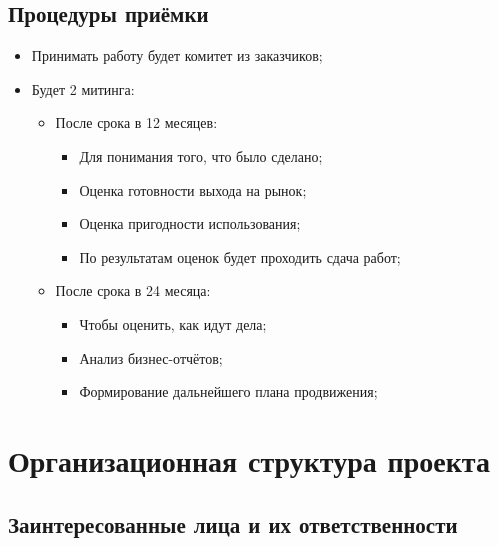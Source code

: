 \documentclass[a4paper,10pt]{article}
\begin{document}
\subsection{Процедуры приёмки}

    \begin{itemize}
        \item Принимать работу будет комитет из заказчиков;
        \item Будет 2 митинга:
            \begin{itemize}
                \item После срока в 12 месяцев:
                    \begin{itemize}
                        \item Для понимания того, что было сделано;
                        \item Оценка готовности выхода на рынок;
                        \item Оценка пригодности использования;
                        \item По результатам оценок будет проходить сдача работ;
                    \end{itemize}
                \item После срока в 24 месяца:
                    \begin{itemize}
                        \item Чтобы оценить, как идут дела;
                        \item Анализ бизнес-отчётов;
                        \item Формирование дальнейшего плана продвижения;
                    \end{itemize}
            \end{itemize}
    \end{itemize}


\section{Организационная структура проекта}

\subsection{Заинтересованные лица и их ответственности}
\end{document}

